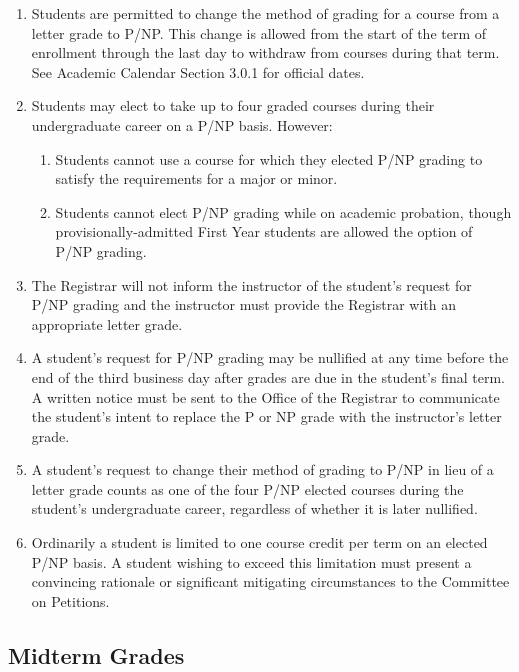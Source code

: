 \documentclass[
  letterpaper,
]{scrbook}
\providecommand{\tightlist}{%
  \setlength{\itemsep}{0pt}\setlength{\parskip}{0pt}}
\begin{document}
\begin{enumerate}
\def\labelenumi{\arabic{enumi}.}
\tightlist
\item
  Students are permitted to change the method of grading for a course
  from a letter grade to P/NP. This change is allowed from the start of
  the term of enrollment through the last day to withdraw from courses
  during that term. See Academic Calendar Section 3.0.1 for official
  dates.
\item
  Students may elect to take up to four graded courses during their
  undergraduate career on a P/NP basis. However:

  \begin{enumerate}
  \def\labelenumii{\alph{enumii}.}
  \tightlist
  \item
    Students cannot use a course for which they elected P/NP grading to
    satisfy the requirements for a major or minor.
  \item
    Students cannot elect P/NP grading while on academic probation,
    though provisionally-admitted First Year students are allowed the
    option of P/NP grading.
  \end{enumerate}
\item
  The Registrar will not inform the instructor of the student's request
  for P/NP grading and the instructor must provide the Registrar with an
  appropriate letter grade.
\item
  A student's request for P/NP grading may be nullified at any time
  before the end of the third business day after grades are due in the
  student's final term. A written notice must be sent to the Office of
  the Registrar to communicate the student's intent to replace the P or
  NP grade with the instructor's letter grade.
\item
  A student's request to change their method of grading to P/NP in lieu
  of a letter grade counts as one of the four P/NP elected courses
  during the student's undergraduate career, regardless of whether it is
  later nullified.
\item
  Ordinarily a student is limited to one course credit per term on an
  elected P/NP basis. A student wishing to exceed this limitation must
  present a convincing rationale or significant mitigating circumstances
  to the Committee on Petitions.
\end{enumerate}

\subsection{Midterm Grades}\label{midterm-grades}
\end{document}
